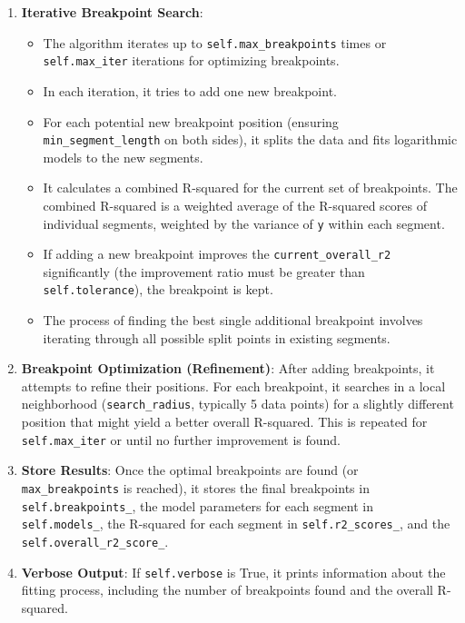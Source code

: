 \documentclass[12pt,a4paper]{report}
\begin{document}
{\begin{itemize}
\begin{enumerate}
            \item \textbf{Iterative Breakpoint Search}:
                \begin{itemize}
                    \item The algorithm iterates up to \texttt{self.max\_breakpoints} times or \texttt{self.max\_iter} iterations for optimizing breakpoints.
                    \item In each iteration, it tries to add one new breakpoint.
                    \item For each potential new breakpoint position (ensuring \texttt{min\_segment\_length} on both sides), it splits the data and fits logarithmic models to the new segments.
                    \item It calculates a combined R-squared for the current set of breakpoints. The combined R-squared is a weighted average of the R-squared scores of individual segments, weighted by the variance of \texttt{y} within each segment.
                    \item If adding a new breakpoint improves the \texttt{current\_overall\_r2} significantly (the improvement ratio must be greater than \texttt{self.tolerance}), the breakpoint is kept.
                    \item The process of finding the best single additional breakpoint involves iterating through all possible split points in existing segments.
                \end{itemize}
            \item \textbf{Breakpoint Optimization (Refinement)}: After adding breakpoints, it attempts to refine their positions. For each breakpoint, it searches in a local neighborhood (\texttt{search\_radius}, typically 5 data points) for a slightly different position that might yield a better overall R-squared. This is repeated for \texttt{self.max\_iter} or until no further improvement is found.
            \item \textbf{Store Results}: Once the optimal breakpoints are found (or \texttt{max\_breakpoints} is reached), it stores the final breakpoints in \texttt{self.breakpoints\_}, the model parameters for each segment in \texttt{self.models\_}, the R-squared for each segment in \texttt{self.r2\_scores\_}, and the \texttt{self.overall\_r2\_score\_}.
            \item \textbf{Verbose Output}: If \texttt{self.verbose} is True, it prints information about the fitting process, including the number of breakpoints found and the overall R-squared.
        \end{enumerate}
\end{itemize}

}
\end{document}
